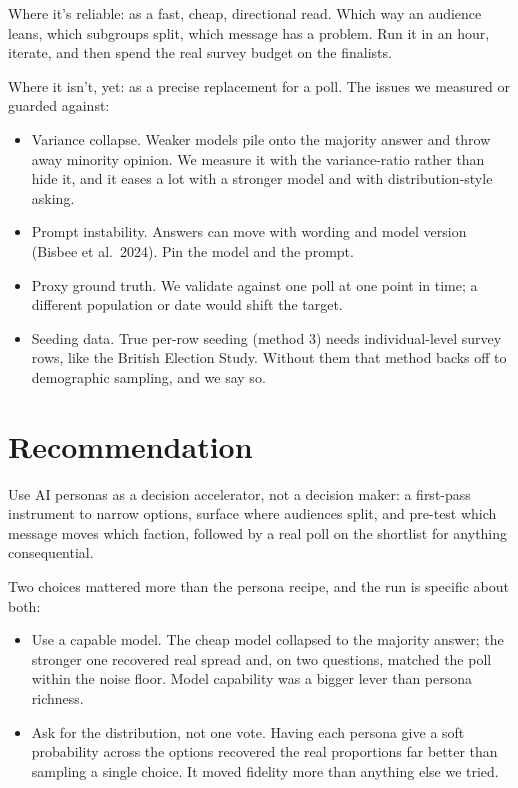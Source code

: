 \documentclass[11pt]{article}
\begin{document}
Where it's reliable: as a fast, cheap, directional read. Which way an audience
leans, which subgroups split, which message has a problem. Run it in an hour,
iterate, and then spend the real survey budget on the finalists.

Where it isn't, yet: as a precise replacement for a poll. The issues we measured or
guarded against:
\begin{itemize}
  \item Variance collapse. Weaker models pile onto the majority answer and throw away minority opinion. We measure it with the variance-ratio rather than hide it, and it eases a lot with a stronger model and with distribution-style asking.
  \item Prompt instability. Answers can move with wording and model version (Bisbee et al.\ 2024). Pin the model and the prompt.
  \item Proxy ground truth. We validate against one poll at one point in time; a different population or date would shift the target.
  \item Seeding data. True per-row seeding (method 3) needs individual-level survey rows, like the British Election Study. Without them that method backs off to demographic sampling, and we say so.
\end{itemize}

\section*{Recommendation}

Use AI personas as a decision accelerator, not a decision maker: a first-pass
instrument to narrow options, surface where audiences split, and pre-test which
message moves which faction, followed by a real poll on the shortlist for anything
consequential.

Two choices mattered more than the persona recipe, and the run is specific about
both:
\begin{itemize}
  \item Use a capable model. The cheap model collapsed to the majority answer; the stronger one recovered real spread and, on two questions, matched the poll within the noise floor. Model capability was a bigger lever than persona richness.
  \item Ask for the distribution, not one vote. Having each persona give a soft probability across the options recovered the real proportions far better than sampling a single choice. It moved fidelity more than anything else we tried.
\end{itemize}
\end{document}
